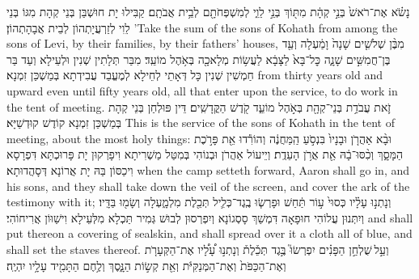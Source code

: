 {נָשֹׂ֗א אֶת־רֹאשׁ֙ בְּנֵ֣י קְהָ֔ת מִתּ֖וֹךְ בְּנֵ֣י לֵוִ֑י לְמִשְׁפְּחֹתָ֖ם לְבֵ֥ית אֲבֹתָֽם׃
}
{קַבִּילוּ יָת חוּשְׁבַּן בְּנֵי קְהָת מִגּוֹ בְּנֵי לֵוִי לְזַרְעֲיָתְהוֹן לְבֵית אֲבָהָתְהוֹן׃}
{’Take the sum of the sons of Kohath from among the sons of Levi, by their families, by their fathers’ houses,}{}
{מִבֶּ֨ן שְׁלֹשִׁ֤ים שָׁנָה֙ וָמַ֔עְלָה וְעַ֖ד בֶּן־חֲמִשִּׁ֣ים שָׁנָ֑ה כׇּל־בָּא֙ לַצָּבָ֔א לַעֲשׂ֥וֹת מְלָאכָ֖ה בְּאֹ֥הֶל מוֹעֵֽד׃}
{מִבַּר תְּלָתִין שְׁנִין וּלְעֵילָא וְעַד בַּר חַמְשִׁין שְׁנִין כָּל דְּאָתֵי לְחֵילָא לְמֶעֱבַד עֲבִידְתָא בְּמַשְׁכַּן זִמְנָא׃}
{from thirty years old and upward even until fifty years old, all that enter upon the service, to do work in the tent of meeting.}{}
{זֹ֛את עֲבֹדַ֥ת בְּנֵי־קְהָ֖ת בְּאֹ֣הֶל מוֹעֵ֑ד קֹ֖דֶשׁ הַקֳּדָשִֽׁים׃
}
{דֵּין פּוּלְחַן בְּנֵי קְהָת בְּמַשְׁכַּן זִמְנָא קוֹדֶשׁ קוּדְשַׁיָּא׃}
{This is the service of the sons of Kohath in the tent of meeting, about the most holy things:}{}
{וּבָ֨א אַהֲרֹ֤ן וּבָנָיו֙ בִּנְסֹ֣עַ הַֽמַּחֲנֶ֔ה וְהוֹרִ֕דוּ אֵ֖ת פָּרֹ֣כֶת הַמָּסָ֑ךְ וְכִ֨סּוּ־בָ֔הּ אֵ֖ת אֲרֹ֥ן הָעֵדֻֽת׃
}
{וְיֵיעוֹל אַהֲרֹן וּבְנוֹהִי בְּמִטַּל מַשְׁרִיתָא וִיפָרְקוּן יָת פָּרוּכְתָּא דִּפְרָסָא וִיכַסּוֹן בַּהּ יָת אֲרוֹנָא דְּסָהֲדוּתָא׃}
{when the camp setteth forward, Aaron shall go in, and his sons, and they shall take down the veil of the screen, and cover the ark of the testimony with it;}{}
{וְנָתְנ֣וּ עָלָ֗יו כְּסוּי֙ ע֣וֹר תַּ֔חַשׁ וּפָרְשׂ֧וּ בֶֽגֶד־כְּלִ֛יל תְּכֵ֖לֶת מִלְמָ֑עְלָה וְשָׂמ֖וּ בַּדָּֽיו׃}
{וְיִתְּנוּן עֲלוֹהִי חוּפָאָה דִּמְשַׁךְ סָסְגוֹנָא וְיִפְרְסוּן לְבוּשׁ גְּמִיר תַּכְלָא מִלְּעֵילָא וִישַׁוּוֹן אֲרִיחוֹהִי׃}
{and shall put thereon a covering of sealskin, and shall spread over it a cloth all of blue, and shall set the staves thereof.}{}
{וְעַ֣ל \legarmeh  שֻׁלְחַ֣ן הַפָּנִ֗ים יִפְרְשׂוּ֮ בֶּ֣גֶד תְּכֵ֒לֶת֒ וְנָתְנ֣וּ עָ֠לָ֠יו אֶת־הַקְּעָרֹ֤ת וְאֶת־הַכַּפֹּת֙ וְאֶת־הַמְּנַקִּיֹּ֔ת וְאֵ֖ת קְשׂ֣וֹת הַנָּ֑סֶךְ וְלֶ֥חֶם הַתָּמִ֖יד עָלָ֥יו יִהְיֶֽה׃
}
